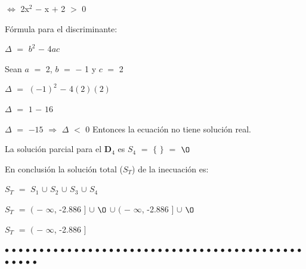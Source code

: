 \documentclass[12pt]{article}
\newenvironment{MyColorPar}[1]{%
    \leavevmode\color{#1}\ignorespaces%
}{%
}%
\begin{document}
\hspace{5.6cm} $\Longleftrightarrow$ \hspace{0.2cm} 2x$^{2}$ $-$ x $+$ 2 $>$ $0$ \vspace{0.5cm}

Fórmula para el discriminante:\vspace{0.5cm}

$\Delta$ $=$ $b^{2}$ $-$ 4$a$$c$ \vspace{0.2cm}

Sean $a$ $=$ 2, \hspace{0.3cm} $b$ $=$ $-$ 1 \hspace{0.3cm} y \hspace{0.3cm} $c$ $=$ 2 \vspace{0.3cm}

$\Delta$ $=$ $(-1)^{2}$ $-$ 4$(2)$$(2)$ \vspace{0.3cm}

$\Delta$ $=$ $1$ $-$ $16$ \vspace{0.3cm}

$\Delta$ $=$ $-15$ \hspace{0.3cm} $\Longrightarrow$ \hspace{0.3cm} 
$\Delta$ $<$ $0$ \hspace{0.1cm} Entonces la ecuación no tiene solución real. \vspace{0.5cm}
 
La solución parcial para el {\bfseries{{\textcolor{Burnt Sienna}{\mbox{D$_{4}$}}}}} es $S_{4}$ $=$ $\big \{$ $\big \}$ $=$ $\O$ \vspace{0.5cm}

En conclusión la solución total ($S_{T}$) de la inecuación es: \vspace{0.5cm} 

\hspace{4cm} $S_{T}$ $=$ $S_{1}$ $\cup$ $S_{2}$ $\cup$ $S_{3}$ $\cup$ $S_{4}$ \vspace{0.5cm} 

\hspace{4cm} $S_{T}$ $=$ $\big($ $-$ $\infty$, -2.886 $\big]$ $\cup$ $\O$ $\cup$ $\big($ $-$ $\infty$, -2.886 $\big]$ $\cup$ $\O$ \vspace{0.5cm} 

\hspace{4cm} $S_{T}$ $=$ $\big($ $-$ $\infty$, -2.886 $\big]$   \vspace{.5cm}

\begin{MyColorPar}{pakistangreen}
$\bullet$ $\bullet$ $\bullet$ $\bullet$ $\bullet$ $\bullet$ $\bullet$ $\bullet$ $\bullet$ $\bullet$ $\bullet$ $\bullet$ $\bullet$ $\bullet$ $\bullet$ $\bullet$ $\bullet$ $\bullet$ $\bullet$ $\bullet$ $\bullet$ $\bullet$ $\bullet$ $\bullet$ $\bullet$ $\bullet$ $\bullet$ $\bullet$ $\bullet$ $\bullet$ $\bullet$ $\bullet$ $\bullet$ $\bullet$ $\bullet$ $\bullet$ $\bullet$ $\bullet$ $\bullet$ $\bullet$ $\bullet$ $\bullet$ $\bullet$ $\bullet$ $\bullet$ $\bullet$ $\bullet$ $\bullet$ 
\end{MyColorPar} 
\end{document}
